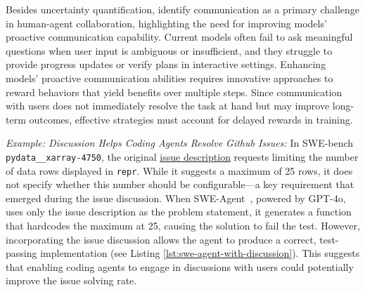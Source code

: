Besides uncertainty quantification, \citet{shao2024collaborativegym} identify communication as a primary challenge in human-agent collaboration, highlighting the need for improving models' proactive communication capability. Current models often fail to ask meaningful questions when user input is ambiguous or insufficient, and they struggle to provide progress updates or verify plans in interactive settings. Enhancing models’ proactive communication abilities requires innovative approaches to reward behaviors that yield benefits over multiple steps. Since communication with users does not immediately resolve the task at hand but may improve long-term outcomes, effective strategies must account for delayed rewards in training.






\begin{tcolorbox}[colback=lightblue, boxrule=0pt, arc=5pt, outer arc=5pt]
\textit{Example: Discussion Helps Coding Agents Resolve Github Issues:} In SWE-bench~\citep{jimenez2024swebench} \texttt{pydata\_\_xarray-4750}, the original \href{https://github.com/pydata/xarray/issues/4736}{issue description} requests limiting the number of data rows displayed in \texttt{repr}. While it suggests a maximum of 25 rows, it does not specify whether this number should be configurable—a key requirement that emerged during the issue discussion. When SWE-Agent~\citep{yang2024sweagent}, powered by GPT-4o, uses only the issue description as the problem statement, it generates a function that hardcodes the maximum at 25, causing the solution to fail the test. However, incorporating the issue discussion allows the agent to produce a correct, test-passing implementation (see Listing \ref{lst:swe-agent-with-discussion}). This suggests that enabling coding agents to engage in discussions with users could potentially improve the issue solving rate.
\end{tcolorbox}

